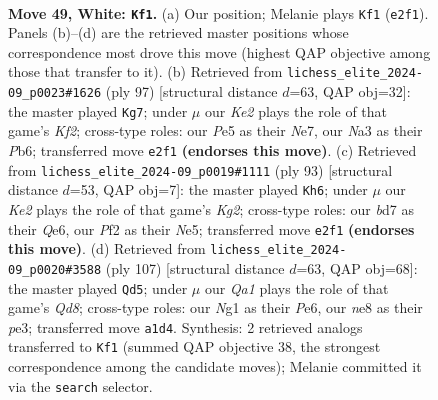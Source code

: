 \documentclass[11pt]{article}
\begin{document}
\clearpage

\begin{figure}[p]\centering
\begin{subfigure}{0.46\textwidth}\centering
\resizebox{\linewidth}{!}{%
\newchessgame
\chessboard[
  setfen={4n3/3b4/p5k1/3PPp1p/6p1/N7/4KP1q/Q5N1 w - - 1 49},
  showmover=false,
  pgfstyle=straightmove, color=movearrow, markmove={e2-f1}
]}
\caption{}
\end{subfigure}\hfill
\begin{subfigure}{0.46\textwidth}\centering
\resizebox{\linewidth}{!}{%
\newchessgame
\chessboard[
  setfen={3q4/4nk2/1p2pp1p/7P/P4QP1/5B2/5PK1/8 b - - 5 49},
  showmover=false,
  pgfstyle=straightmove, color=movearrow, markmove={f7-g7}
]}
\caption{}
\end{subfigure}
\\[4pt]
\begin{subfigure}{0.46\textwidth}\centering
\resizebox{\linewidth}{!}{%
\newchessgame
\chessboard[
  setfen={8/2p3k1/4q3/4n1pN/1P2Q3/3p3P/3P1PP1/6K1 b - - 0 47},
  showmover=false,
  pgfstyle=straightmove, color=movearrow, markmove={g7-h6}
]}
\caption{}
\end{subfigure}\hfill
\begin{subfigure}{0.46\textwidth}\centering
\resizebox{\linewidth}{!}{%
\newchessgame
\chessboard[
  setfen={8/4Qp1k/3np2p/8/7P/4P1NK/5P2/3q4 b - - 3 54},
  showmover=false,
  pgfstyle=straightmove, color=movearrow, markmove={d1-d5}
]}
\caption{}
\end{subfigure}
\caption{\textbf{Move 49, White: \texttt{Kf1}.} (a) Our position; Melanie plays \texttt{Kf1} (\texttt{e2f1}). Panels (b)--(d) are the retrieved master positions whose correspondence most drove this move (highest QAP objective among those that transfer to it). (b) Retrieved from \texttt{lichess\_elite\_2024-09\_p0023\#1626} (ply 97) [structural distance $d$=63, QAP obj=32]: the master played \texttt{Kg7}; under $\mu$ our \emph{Ke2} plays the role of that game's \emph{Kf2}; cross-type roles: our \emph{P}e5 as their \emph{N}e7, our \emph{N}a3 as their \emph{P}b6; transferred move \texttt{e2f1} \textbf{(endorses this move)}. (c) Retrieved from \texttt{lichess\_elite\_2024-09\_p0019\#1111} (ply 93) [structural distance $d$=53, QAP obj=7]: the master played \texttt{Kh6}; under $\mu$ our \emph{Ke2} plays the role of that game's \emph{Kg2}; cross-type roles: our \emph{b}d7 as their \emph{Q}e6, our \emph{P}f2 as their \emph{N}e5; transferred move \texttt{e2f1} \textbf{(endorses this move)}. (d) Retrieved from \texttt{lichess\_elite\_2024-09\_p0020\#3588} (ply 107) [structural distance $d$=63, QAP obj=68]: the master played \texttt{Qd5}; under $\mu$ our \emph{Qa1} plays the role of that game's \emph{Qd8}; cross-type roles: our \emph{N}g1 as their \emph{P}e6, our \emph{n}e8 as their \emph{p}e3; transferred move \texttt{a1d4}. Synthesis: 2 retrieved analogs transferred to \texttt{Kf1} (summed QAP objective 38, the strongest correspondence among the candidate moves); Melanie committed it via the \texttt{search} selector.}
\label{fig:thought-m96}
\end{figure}
\end{document}
